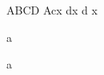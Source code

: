 \documentclass{article}
\begin{document}
\def\aaa{}
\def\yyy{Y}
\def\zzz{Z}
\def\www{W}
\def\xxx#1a#2b#3c{#1 #2 #3}
ABCD
\def\U#1{#1#1}
\def\A#1{\B{b#1b}}
\def\B#1{c#1\aaa x d}
{}A\B{}x d
x

a

a

\end{document}
